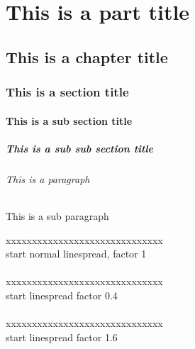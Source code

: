 \documentclass[12pt, a4paper]{report}
\begin{document}
\part{This is a part title}
\chapter{This is a chapter title}
\section[This is Short section title]{This is a section title}
\subsection{This is a sub section title}
\subsubsection{This is a sub sub section title}
\paragraph{This is a paragraph}
\subparagraph{This is a sub paragraph}


\newpage

xxxxxxxxxxxxxxxxxxxxxxxxxxxxxx\\
\linespread{1}\selectfont
start normal linespread, factor 1\\
\lipsum[1]\\


xxxxxxxxxxxxxxxxxxxxxxxxxxxxxx\\
\linespread{0.4}\selectfont
start linespread factor 0.4\\
\lipsum[2]\\


xxxxxxxxxxxxxxxxxxxxxxxxxxxxxx\\
\linespread{1.6}\selectfont
start linespread factor 1.6\\
\lipsum[3]\\















\end{document}
